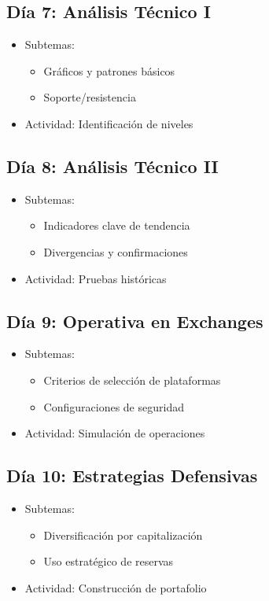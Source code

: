 \documentclass{article}
\begin{document}
\subsection*{Día 7: Análisis Técnico I}
\begin{itemize}
    \item Subtemas:
    \begin{itemize}
        \item Gráficos y patrones básicos
        \item Soporte/resistencia
    \end{itemize}
    \item Actividad: Identificación de niveles
\end{itemize}

\subsection*{Día 8: Análisis Técnico II}
\begin{itemize}
    \item Subtemas:
    \begin{itemize}
        \item Indicadores clave de tendencia
        \item Divergencias y confirmaciones
    \end{itemize}
    \item Actividad: Pruebas históricas
\end{itemize}

\subsection*{Día 9: Operativa en Exchanges}
\begin{itemize}
    \item Subtemas:
    \begin{itemize}
        \item Criterios de selección de plataformas
        \item Configuraciones de seguridad
    \end{itemize}
    \item Actividad: Simulación de operaciones
\end{itemize}

\subsection*{Día 10: Estrategias Defensivas}
\begin{itemize}
    \item Subtemas:
    \begin{itemize}
        \item Diversificación por capitalización
        \item Uso estratégico de reservas
    \end{itemize}
    \item Actividad: Construcción de portafolio
\end{itemize}
\end{document}
